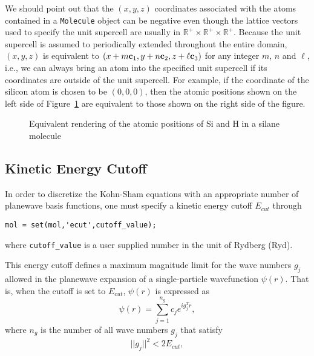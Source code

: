 \documentclass[11pt]{book}
\begin{document}
We should point out that the $(x,y,z)$ coordinates associated with
the atoms contained in a {\tt Molecule} object can be negative even 
though the lattice vectors used to specify the unit supercell are usually in 
$\mathbb{R}^+\times \mathbb{R}^+ \times \mathbb{R}^+$.  Because 
the unit supercell is assumed to periodically extended throughout
the entire domain, $(x,y,z)$ is equivalent to 
$(x+m{\bf c}_1,y+n{\bf c}_2, z+\ell{\bf c}_3)$ for any integer
$m$, $n$ and $\ell$, i.e., we can always bring an atom into 
the specified unit supercell if its coordinates are outside of the unit 
supercell.  For example, if the coordinate of the silicon atom is
chosen to be $(0,0,0)$, then the atomic positions shown on the left
side of Figure~\ref{sih4atom} are equivalent to those shown
on the right side of the figure.
\begin{figure}[htbp]
\hfill
\begin{center}
\end{center}
\caption{Equivalent rendering of the atomic positions of Si and H in a
silane molecule}
\label{sih4atom}
\end{figure}


\subsection{Kinetic Energy Cutoff}  
In order to discretize the Kohn-Sham equations with an appropriate number
of planewave basis functions, one must specify a kinetic energy cutoff
$E_{cut}$ through 
\begin{verbatim}
mol = set(mol,'ecut',cutoff_value);
\end{verbatim}
where {\tt cutoff\_value} is a user supplied number in the unit of Rydberg (Ryd).

This energy cutoff defines a maximum magnitude limit for the wave numbers 
$g_j$ allowed in the planewave expansion of a single-particle wavefunction 
$\psi(r)$.  That is, when the cutoff is set to $E_{cut}$, $\psi(r)$ is 
expressed as
\begin{equation}
\psi(r) = \sum_{j=1}^{n_g} c_j e^{i g_j^T r}, 
 \label{fexpand}
\end{equation}
where $n_g$ is the number of all wave numbers $g_j$ that satisfy
\begin{equation}
||g_j ||^2 < 2 E_{cut}, \label{ecut}
\end{equation}
\end{document}

